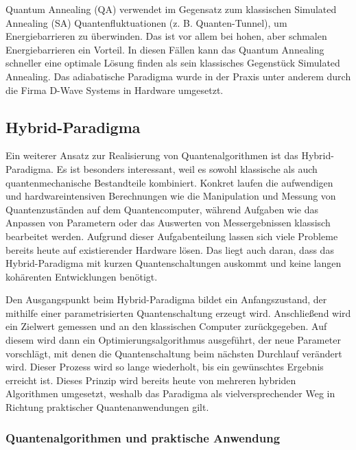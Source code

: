 Quantum Annealing (QA) verwendet im Gegensatz zum klassischen Simulated Annealing (SA) Quantenfluktuationen (z. B. Quanten-Tunnel), um Energiebarrieren zu überwinden. Das ist vor allem bei hohen, aber schmalen Energiebarrieren ein Vorteil. In diesen Fällen kann das Quantum Annealing schneller eine optimale Lösung finden als sein klassisches Gegenstück Simulated Annealing. Das adiabatische Paradigma wurde in der Praxis unter anderem durch die Firma D-Wave Systems in Hardware umgesetzt. \autocite[2-4]{rajak_quantum_2022} \autocite[4-5, 42-43]{albash_adiabatic_2018}

\subsection{Hybrid-Paradigma}

Ein weiterer Ansatz zur Realisierung von Quantenalgorithmen ist das Hybrid-Paradigma. Es ist besonders interessant, weil es sowohl klassische als auch quantenmechanische Bestandteile kombiniert. Konkret laufen die aufwendigen und hardwareintensiven Berechnungen wie die Manipulation und Messung von Quantenzuständen auf dem Quantencomputer, während Aufgaben wie das Anpassen von Parametern oder das Auswerten von Messergebnissen klassisch bearbeitet werden. Aufgrund dieser Aufgabenteilung lassen sich viele Probleme bereits heute auf existierender Hardware lösen. Das liegt auch daran, dass das Hybrid-Paradigma mit kurzen Quantenschaltungen auskommt und keine langen kohärenten Entwicklungen benötigt. \autocite[1-2]{cerezo_variational_2022}

Den Ausgangspunkt beim Hybrid-Paradigma bildet ein Anfangszustand, der mithilfe einer parametrisierten Quantenschaltung erzeugt wird. Anschließend wird ein Zielwert gemessen und an den klassischen Computer zurückgegeben. Auf diesem wird dann ein Optimierungsalgorithmus ausgeführt, der neue Parameter vorschlägt, mit denen die Quantenschaltung beim nächsten Durchlauf verändert wird. Dieser Prozess wird so lange wiederholt, bis ein gewünschtes Ergebnis erreicht ist. Dieses Prinzip wird bereits heute von mehreren hybriden Algorithmen umgesetzt, weshalb das Paradigma als vielversprechender Weg in Richtung praktischer Quantenanwendungen gilt.

\subsubsection*{Quantenalgorithmen und praktische Anwendung}

